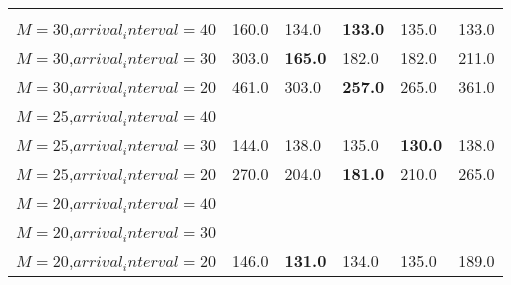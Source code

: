 \begin{tabular}{l  | l l l l l }
& \multicolumn{5}{c}{} \\
$M=30$,$arrival_interval=40$ & 160.0 & 134.0 & \textbf{133.0} & 135.0 & 133.0 \\
$M=30$,$arrival_interval=30$ & 303.0 & \textbf{165.0} & 182.0 & 182.0 & 211.0 \\
$M=30$,$arrival_interval=20$ & 461.0 & 303.0 & \textbf{257.0} & 265.0 & 361.0 \\
$M=25$,$arrival_interval=40$ &  &  &  &  &  \\
$M=25$,$arrival_interval=30$ & 144.0 & 138.0 & 135.0 & \textbf{130.0} & 138.0 \\
$M=25$,$arrival_interval=20$ & 270.0 & 204.0 & \textbf{181.0} & 210.0 & 265.0 \\
$M=20$,$arrival_interval=40$ &  &  &  &  &  \\
$M=20$,$arrival_interval=30$ &  &  &  &  &  \\
$M=20$,$arrival_interval=20$ & 146.0 & \textbf{131.0} & 134.0 & 135.0 & 189.0
\end{tabular}